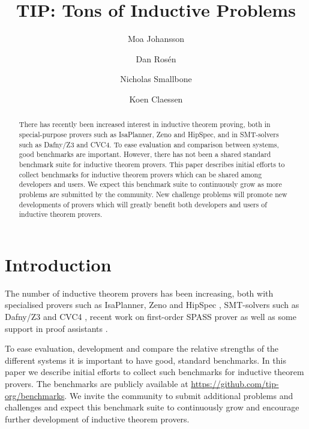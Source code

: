\documentclass{llncs}
\begin{document}
\title{TIP: Tons of Inductive Problems}

\author{Moa Johansson \and Dan Ros\'en \and Nicholas Smallbone \and Koen Claessen}

\titlerunning{}

\maketitle

\begin{abstract}
There has recently been increased interest in inductive theorem
proving, both in special-purpose provers such as
IsaPlanner, Zeno and HipSpec, and in SMT-solvers such as
Dafny/Z3 and CVC4. To ease evaluation and comparison between systems,
good benchmarks are important. However, there has not been a shared
standard benchmark suite for inductive theorem provers. This paper
describes initial efforts to collect benchmarks for inductive theorem
provers which can be shared among developers and users. 
We expect this benchmark suite to continuously grow as
more problems are submitted by the community. New challenge problems
will promote new developments of provers which will greatly benefit
both developers and users of inductive theorem provers. 

\end{abstract}

\section{Introduction}

The number of inductive theorem provers has been increasing, both with specialised provers such as IsaPlanner, Zeno and HipSpec \cite{dixon2007isaplanner,zeno,hipspecCADE}, SMT-solvers such as Dafny/Z3 and CVC4 \cite{dafny,cvc4}, recent work on first-order SPASS prover \cite{SPASSInduction} as well as some support in proof assistants \cite{acl2,hipster}. 

To ease evaluation, development and compare the relative strengths of the different systems it is important to have good, standard benchmarks. In this paper we describe initial efforts to collect such benchmarks for inductive theorem provers. The benchmarks are publicly available at \url{https://github.com/tip-org/benchmarks}. We invite the community to submit additional problems and challenges and expect this benchmark suite to continuously grow and encourage further development of inductive theorem provers. 
\end{document}
